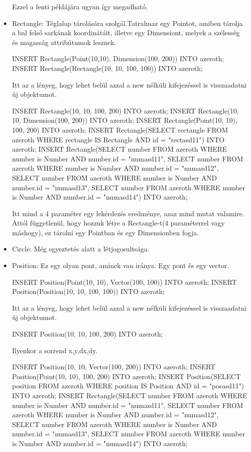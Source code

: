 \begin{itemize}
Ezzel a fenti példájára ugyan így megadható.

\item Rectangle: Téglalap tárolására szolgál.Tatralmaz egy Pointot, amiben tárolja a bal felső sarkának koordinátáit, illetve egy Dimensiont, melyek a szélesség és magasság attribútumok lesznek.

\begin{sql}
INSERT Rectangle(Point(10,10), Dimension(100, 200)) INTO azeroth;
INSERT Rectangle(Rectangle(10, 10, 100, 100)) INTO azeroth;
\end{sql}

Itt az a lényeg, hogy lehet belül azzal a new nélküli kifejezéssel is visszaadatni új objektumot.

\begin{sql}
INSERT Rectangle(10, 10, 100, 200) INTO azeroth;
INSERT Rectangle(10, 10, Dimension(100, 200)) INTO azeroth;
INSERT Rectangle(Point(10, 10), 100, 200) INTO azeroth;
INSERT Rectangle(SELECT rectangle FROM azeroth WHERE rectangle IS Rectangle AND id = "rectasd11") INTO azeroth;
INSERT Rectangle(SELECT number FROM azeroth WHERE number is Number AND number.id = "numasd11", SELECT number FROM azeroth WHERE number is Number AND number.id = "numasd12", SELECT number FROM azeroth WHERE number is Number AND number.id = "numasd13", SELECT number FROM azeroth WHERE number is Number AND number.id = "numasd14") INTO azeroth;
\end{sql}

Itt mind a 4 paraméter egy lekérdezés eredménye, azaz mind mutat valamire.
Attól függetlenül, hogy hozzuk létre a Rectangle-t(4 paraméterrel vagy máshogy),  ez tárolni egy Pointban és egy Dimensionben fogja.

\item Circle: Még egyeztetés alatt a létjogosultsága.


\item Position: Ez egy olyan pont, aminek van iránya. Egy pont és egy vector.
\begin{sql}
INSERT Position(Point(10, 10),  Vector(100, 100)) INTO azeroth;
INSERT Position(Position(10, 10, 100, 100)) INTO azeroth;
\end{sql}

Itt az a lényeg, hogy lehet belül azzal a new nélküli kifejezéssel is visszaadatni új objektumot.

\begin{sql}
INSERT Position(10, 10, 100, 200) INTO azeroth;
\end{sql}
Ilyenkor a sorrend x,y,dx,dy.
\begin{sql}
INSERT Position(10, 10, Vector(100, 200)) INTO azeroth;
INSERT Position(Point(10, 10), 100, 200) INTO azeroth;
INSERT Position(SELECT position FROM azeroth WHERE position IS Position AND id = "posasd11") INTO azeroth;
INSERT Rectangle(SELECT number FROM azeroth WHERE number is Number AND number.id = "numasd11", SELECT number FROM azeroth WHERE number is Number AND number.id = "numasd12", SELECT number FROM azeroth WHERE number is Number AND number.id = "numasd13", SELECT number FROM azeroth WHERE number is Number AND number.id = "numasd14") INTO azeroth;
\end{sql}


\end{itemize}
